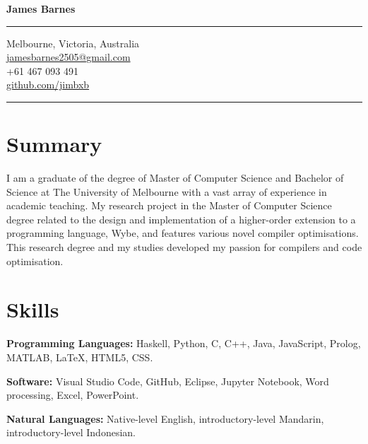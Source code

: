 \documentclass[9pt]{extarticle}
\newcommand{\skills}[2]{
    \textbf{#1} \newline
    #2
}
\begin{document}
\pagestyle{empty} 

\begin{minipage}[t]{.31\textwidth}
\vspace*{0pt}

\begin{center}
{\huge \bfseries James Barnes\par}
\end{center}

\bigskip
\hrule
\bigskip

\begin{center}
Melbourne, Victoria, Australia \\
\href{mailto:jamesbarnes2505@gmail.com}{jamesbarnes2505@gmail.com} \\
+61 467 093 491 \\
\href{http://github.com/jimbxb}{github.com/jimbxb}
\end{center}

\bigskip
\hrule
\bigskip

\section{Summary}

\begin{flushleft}
I am a graduate of the degree of Master of Computer Science and Bachelor of Science at 
The University of Melbourne with a vast array of experience in academic teaching. 
My research project in the Master of Computer Science degree related to the design and implementation 
of a higher-order extension to a programming language, Wybe, and features various novel compiler optimisations.
This research degree and my studies developed my passion for compilers and code optimisation.
\end{flushleft} 

\medskip

\section{Skills}

\skills{Programming Languages:}
{Haskell, Python, C, C++, Java, JavaScript, Prolog, MATLAB, {\fontfamily{cmr}\selectfont \LaTeX{}}, HTML5, CSS. \newline }

\skills{Software:}
{Visual Studio Code, GitHub, Eclipse, Jupyter Notebook, Word processing, Excel, PowerPoint. \newline }

\skills{Natural Languages:}
{Native-level English, introductory-level Mandarin, introductory-level Indonesian.}


\end{minipage}
\end{document}
